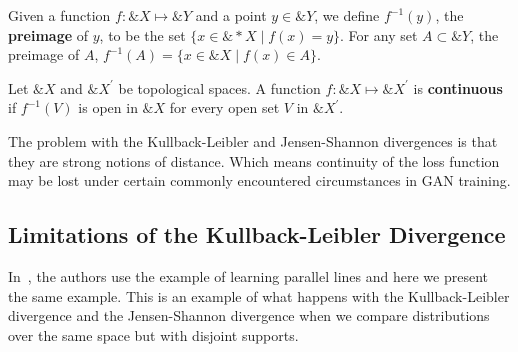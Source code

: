 \begin{definition}
  Given a function $f: \&X \mapsto \&Y$ and a point $y \in \&Y$, we
  define $f^{-1}(y)$, the \textbf{preimage} of $y$, to be the set
  $\{x \in \&*X \mid f(x) = y\}$.  For any set $A \subset \&Y$, the
  preimage of $A$, $f^{-1}(A) = \{x \in \&X \mid f(x) \in A\}$.
\end{definition}

\begin{definition}
  Let $\&X$ and $\&X^\prime$ be topological spaces.  A function
  $f: \&X \mapsto \&X^\prime$ is \textbf{continuous} if $f^{-1}(V)$ is
  open in $\&X$ for every open set $V$ in $\&X^\prime$.
\end{definition}

The problem with the Kullback-Leibler and Jensen-Shannon divergences
is that they are strong notions of distance. Which means continuity of
the loss function may be lost under certain commonly encountered
circumstances in GAN training.

\subsection{Limitations of the Kullback-Leibler Divergence}

In~\cite{ref:arjovsky-2017}, the authors use the example of learning
parallel lines and here we present the same example. This is an
example of what happens with the Kullback-Leibler divergence and the
Jensen-Shannon divergence when we compare distributions over the same
space but with disjoint supports.

